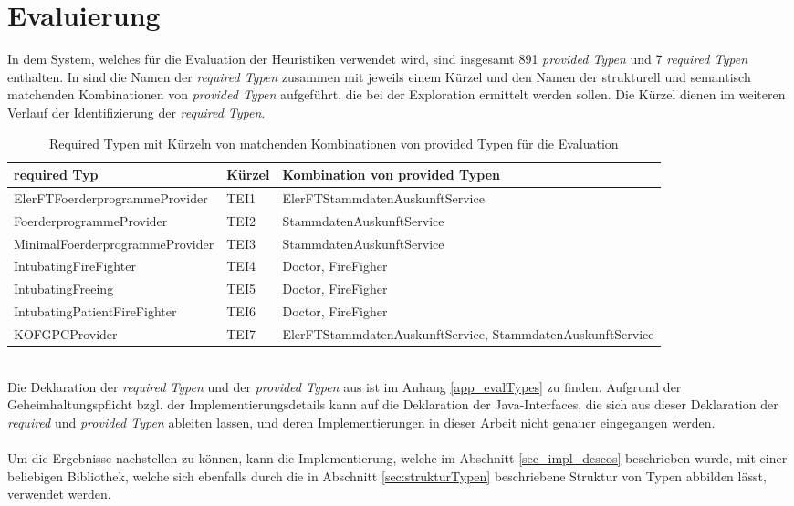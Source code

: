 \chapter{Evaluierung}\label{chap_evaluation}
In dem System, welches für die Evaluation der Heuristiken verwendet wird, sind insgesamt 891 \emph{provided Typen} und 7 \emph{required Typen} enthalten. In  sind die Namen der \emph{required Typen} zusammen mit jeweils einem Kürzel und den Namen der strukturell und semantisch matchenden Kombinationen von \emph{provided Typen} aufgeführt, die bei der Exploration ermittelt werden sollen. Die Kürzel dienen im weiteren Verlauf der Identifizierung der \emph{required Typen}.
\begin{table}[h!]
\centering
\small
\begin{tabular}{|p{6cm}|p{1.5cm}|p{6.5cm}|}
\hline
\hline
\centering\textbf{required Typ} & \textbf{Kürzel} & \textbf{Kombination von provided Typen}\\
\hline
\hline
ElerFTFoerderprogrammeProvider & TEI1 & ElerFTStammdatenAuskunftService\\
\hline
FoerderprogrammeProvider & TEI2 & StammdatenAuskunftService\\
\hline
MinimalFoerderprogrammeProvider & TEI3 & StammdatenAuskunftService\\
\hline
IntubatingFireFighter & TEI4 & Doctor, FireFigher\\
\hline
IntubatingFreeing & TEI5 & Doctor, FireFigher\\
\hline
IntubatingPatientFireFighter & TEI6 & Doctor, FireFigher\\
\hline
KOFGPCProvider & TEI7 & ElerFTStammdatenAuskunftService, StammdatenAuskunftService\\
\hline
\hline
\end{tabular}
\caption{Required Typen mit Kürzeln von matchenden Kombinationen von provided Typen für die Evaluation}
 \label{tab:eIShort}
\end{table}
\noindent
\\
Die Deklaration der \emph{required Typen} und der \emph{provided Typen} aus  ist im Anhang \ref{app_evalTypes} zu finden. Aufgrund der Geheimhaltungspflicht bzgl. der Implementierungsdetails kann auf die Deklaration der Java-Interfaces, die sich aus dieser Deklaration der \emph{required} und \emph{provided Typen} ableiten lassen, und deren Implementierungen in dieser Arbeit nicht genauer eingegangen werden.
\\\\
Um die Ergebnisse nachstellen zu können, kann die Implementierung, welche im Abschnitt \ref{sec_impl_descos} beschrieben wurde, mit einer beliebigen Bibliothek, welche sich ebenfalls durch die in Abschnitt \ref{sec:strukturTypen} beschriebene Struktur von Typen abbilden lässt, verwendet werden.

